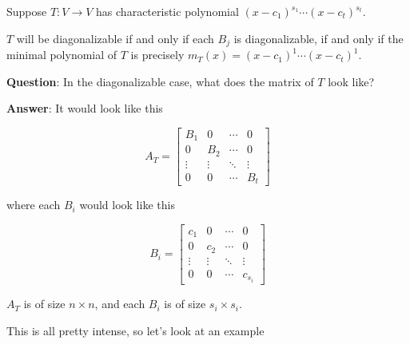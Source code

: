\documentclass[12pt]{article}
\begin{document}
  Suppose $T: V \to V$ has characteristic polynomial $(x - c_1)^{s_1} \cdots (x
  - c_t)^{s_t}$.

  $T$ will be diagonalizable if and only if each $B_j$ is diagonalizable, if and
  only if the minimal polynomial of $T$ is precisely $m_T(x) = (x - c_1)^1
  \cdots (x - c_t)^1$.

  {\bf Question}: In the diagonalizable case, what does the matrix of $T$ look
  like?

  {\bf Answer}: It would look like this

  \[
    A_T = \begin{bmatrix}
      B_1 & 0 & \cdots & 0 \\
      0 & B_2 & \cdots & 0 \\
      \vdots & \vdots & \ddots & \vdots \\
      0 & 0 & \cdots & B_t
    \end{bmatrix}
  \]

  where each $B_i$ would look like this

  \[
    B_i = \begin{bmatrix}
      c_1 & 0 & \cdots & 0 \\
      0 & c_2 & \cdots & 0 \\
      \vdots & \vdots & \ddots & \vdots \\
      0 & 0 & \cdots & c_{s_i}
    \end{bmatrix}
  \]

  $A_T$ is of size $n \times n$, and each $B_i$ is of size $s_i \times s_i$.

  This is all pretty intense, so let's look at an example
\end{document}
